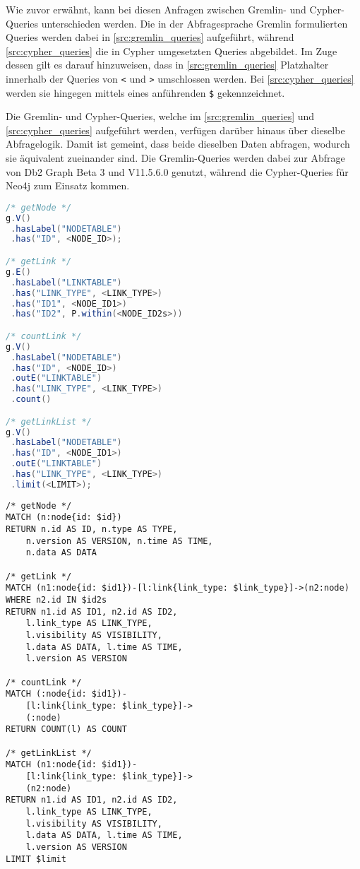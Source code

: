 Wie zuvor erwähnt, kann bei diesen Anfragen zwischen Gremlin- und Cypher-Queries unterschieden werden. Die in der Abfragesprache Gremlin formulierten Queries werden dabei in \autoref{src:gremlin_queries} aufgeführt, während \autoref{src:cypher_queries} die in Cypher umgesetzten Queries abgebildet. Im Zuge dessen gilt es darauf hinzuweisen, dass in \autoref{src:gremlin_queries} Platzhalter innerhalb der Queries von \texttt{<} und \texttt{>} umschlossen werden. Bei \autoref{src:cypher_queries} werden sie hingegen mittels eines anführenden \texttt{\$} gekennzeichnet.

Die Gremlin- und Cypher-Queries, welche im \autoref{src:gremlin_queries} und \autoref{src:cypher_queries} aufgeführt werden, verfügen darüber hinaus über dieselbe Abfragelogik. Damit ist gemeint, dass beide dieselben Daten abfragen, wodurch sie äquivalent zueinander sind. Die Gremlin-Queries werden dabei zur Abfrage von Db2 Graph Beta 3 und V11.5.6.0 genutzt, während die Cypher-Queries für Neo4j zum Einsatz kommen. 

\begin{lstlisting}[label=src:gremlin_queries,caption={Gremlin-Queries},language=Java]
/* getNode */
g.V()
 .hasLabel("NODETABLE")
 .has("ID", <NODE_ID>);

/* getLink */
g.E()
 .hasLabel("LINKTABLE")
 .has("LINK_TYPE", <LINK_TYPE>)
 .has("ID1", <NODE_ID1>)
 .has("ID2", P.within(<NODE_ID2s>))

/* countLink */
g.V()
 .hasLabel("NODETABLE")
 .has("ID", <NODE_ID>)
 .outE("LINKTABLE")
 .has("LINK_TYPE", <LINK_TYPE>)
 .count()

/* getLinkList */
g.V()
 .hasLabel("NODETABLE")
 .has("ID", <NODE_ID1>)
 .outE("LINKTABLE")
 .has("LINK_TYPE", <LINK_TYPE>)
 .limit(<LIMIT>);
\end{lstlisting}

\begin{lstlisting}[label=src:cypher_queries,caption={Cypher-Queries},language=CQL]
/* getNode */
MATCH (n:node{id: $id}) 
RETURN n.id AS ID, n.type AS TYPE, 
    n.version AS VERSION, n.time AS TIME, 
    n.data AS DATA

/* getLink */
MATCH (n1:node{id: $id1})-[l:link{link_type: $link_type}]->(n2:node) 
WHERE n2.id IN $id2s 
RETURN n1.id AS ID1, n2.id AS ID2, 
    l.link_type AS LINK_TYPE, 
    l.visibility AS VISIBILITY, 
    l.data AS DATA, l.time AS TIME, 
    l.version AS VERSION

/* countLink */
MATCH (:node{id: $id1})-
    [l:link{link_type: $link_type}]->
    (:node) 
RETURN COUNT(l) AS COUNT

/* getLinkList */
MATCH (n1:node{id: $id1})-
    [l:link{link_type: $link_type}]->
    (n2:node) 
RETURN n1.id AS ID1, n2.id AS ID2, 
    l.link_type AS LINK_TYPE, 
    l.visibility AS VISIBILITY, 
    l.data AS DATA, l.time AS TIME, 
    l.version AS VERSION 
LIMIT $limit
\end{lstlisting}

